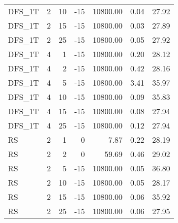 \begin{center}
\begin{longtable}{lrrrrrr}
  DFS\_1T     & 2 & 10 & -15 & 10800.00 & 0.04 & 27.92 \\ 
  DFS\_1T     & 2 & 15 & -15 & 10800.00 & 0.03 & 27.89 \\ 
  DFS\_1T     & 2 & 25 & -15 & 10800.00 & 0.05 & 27.92 \\ 
  DFS\_1T     & 4 & 1 & -15 & 10800.00 & 0.20 & 28.12 \\ 
  DFS\_1T     & 4 & 2 & -15 & 10800.00 & 0.42 & 28.16 \\ 
  DFS\_1T     & 4 & 5 & -15 & 10800.00 & 3.41 & 35.97 \\ 
  DFS\_1T     & 4 & 10 & -15 & 10800.00 & 0.09 & 35.83 \\ 
  DFS\_1T     & 4 & 15 & -15 & 10800.00 & 0.08 & 27.94 \\ 
  DFS\_1T     & 4 & 25 & -15 & 10800.00 & 0.12 & 27.94 \\ 
  RS     & 2 & 1 &   0 & 7.87 & 0.22 & 28.19 \\ 
  RS     & 2 & 2 &   0 & 59.69 & 0.46 & 29.02 \\ 
  RS     & 2 & 5 & -15 & 10800.00 & 0.05 & 36.80 \\ 
  RS     & 2 & 10 & -15 & 10800.00 & 0.05 & 28.17 \\ 
  RS     & 2 & 15 & -15 & 10800.00 & 0.06 & 35.92 \\ 
  RS     & 2 & 25 & -15 & 10800.00 & 0.06 & 27.95 \\ 

\end{longtable}
\end{center}
